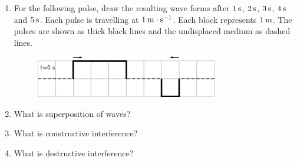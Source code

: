 \begin{enumerate}[noitemsep, label=\textbf{\arabic*}. ]
    \addtocounter{footnote}{-0}
            \label{m38802*uid61}\item For the following pulse, draw the resulting wave forms after \begin{math}1\phantom{\rule{2pt}{0ex}}\mathrm{s}\end{math}, \begin{math}2\phantom{\rule{2pt}{0ex}}\mathrm{s}\end{math}, \begin{math}3\phantom{\rule{2pt}{0ex}}\mathrm{s}\end{math}, \begin{math}4\phantom{\rule{2pt}{0ex}}\mathrm{s}\end{math} and \begin{math}5\phantom{\rule{2pt}{0ex}}\mathrm{s}\end{math}. Each pulse is travelling at \begin{math}1\phantom{\rule{2pt}{0ex}}\mathrm{m}\ensuremath{\cdot}\mathrm{s}{}^{-1}\end{math}. Each block represents \begin{math}1\phantom{\rule{2pt}{0ex}}\mathrm{m}\end{math}. The pulses are shown as thick black lines and the undisplaced medium as dashed lines.
    \setcounter{subfigure}{0}


	\begin{figure}[H] %
    \begin{center}
    \label{m38802*id316547!!!underscore!!!media}\label{m38802*id316547!!!underscore!!!printimage}\includegraphics[width=300px]{col11305.imgs/m38802_PG10C4_029.png} %
        
      \vspace{2pt}
    \vspace{.1in}
    
    \end{center}

 \end{figure}   

    \addtocounter{footnote}{-0}
            \label{m38802*uid62}\item 
          What is superposition of waves?\newline
            
\label{m38802*uid64}\item What is constructive interference?\newline
            
\label{m38802*uid65}\item What is destructive interference?\newline
            
        \end{enumerate}
        
